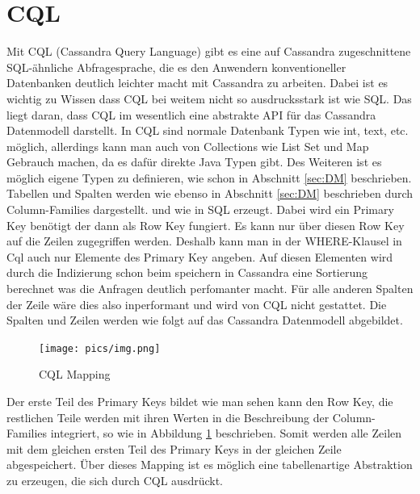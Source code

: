 \section{CQL}
Mit CQL (Cassandra Query Language) gibt es eine auf Cassandra zugeschnittene SQL-ähnliche Abfragesprache, die es den Anwendern konventioneller Datenbanken deutlich leichter macht mit Cassandra zu arbeiten. Dabei ist es wichtig zu Wissen dass CQL bei weitem nicht so ausdrucksstark ist wie SQL. Das liegt daran, dass CQL im wesentlich eine abstrakte API für das Cassandra Datenmodell darstellt. In CQL sind normale Datenbank Typen wie int, text, etc. möglich, allerdings kann man auch von Collections wie List Set und Map Gebrauch machen, da es dafür direkte Java Typen gibt. Des Weiteren ist es möglich eigene Typen zu definieren, wie schon in Abschnitt \ref{sec:DM} beschrieben.\\
Tabellen und Spalten werden wie ebenso in Abschnitt \ref{sec:DM} beschrieben durch Column-Families dargestellt. und wie in SQL erzeugt. Dabei wird ein Primary Key benötigt der dann als Row Key fungiert. Es kann nur über diesen Row Key auf die Zeilen zugegriffen werden. Deshalb kann man in der WHERE-Klausel in Cql auch nur Elemente des Primary Key angeben. Auf diesen Elementen wird durch die Indizierung schon beim speichern in Cassandra eine Sortierung berechnet was die Anfragen deutlich perfomanter macht. Für alle anderen Spalten der Zeile wäre dies also inperformant und wird von CQL nicht gestattet. Die Spalten und Zeilen werden wie folgt auf das Cassandra Datenmodell abgebildet.\\
\begin{figure}
	\centering
	\texttt{[image: pics/img.png]}
	\caption{CQL Mapping}
	\label{fig:mapping}
\end{figure}
Der erste Teil des Primary Keys bildet wie man sehen kann den Row Key, die restlichen Teile werden mit ihren Werten in die Beschreibung der Column-Families integriert, so wie in Abbildung \ref{fig:mapping} beschrieben. Somit werden alle Zeilen mit dem gleichen ersten Teil des Primary Keys in der gleichen Zeile abgespeichert. Über dieses Mapping ist es möglich eine tabellenartige Abstraktion zu erzeugen, die sich durch CQL ausdrückt.